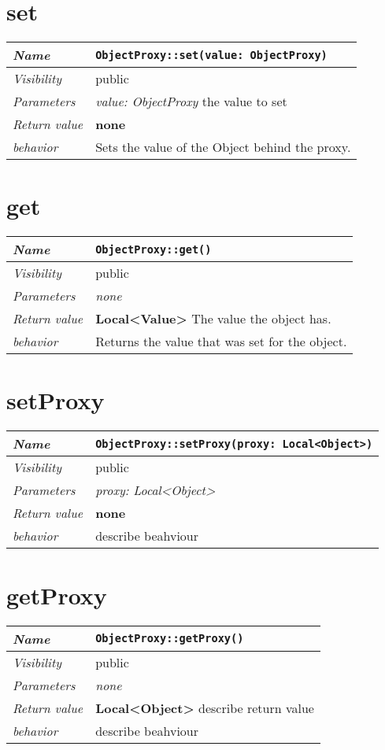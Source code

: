  \section{set}
\begin{longtable}{p{3cm} @{\hskip 1cm} p{12cm}}
 \hline
\textit{Name} & \texttt{ObjectProxy::set(value: ObjectProxy)}\\
\hline
 \textit{Visibility} & public\\
\hline
\textit{Parameters} & \textit{value: ObjectProxy} the value to set\\
\hline
\textit{Return value} & \textbf{none}\\
  \hline
 \textit{behavior} & Sets the value of the Object behind the proxy.\\
\hline
\end{longtable} \pagebreak
 \section{get}
\begin{longtable}{p{3cm} @{\hskip 1cm} p{12cm}}
 \hline
\textit{Name} & \texttt{ObjectProxy::get()}\\
\hline
 \textit{Visibility} & public\\
\hline
\textit{Parameters} & \textit{none}\\
\hline
\textit{Return value} & \textbf{Local<Value>} The value the object has.\\
  \hline
 \textit{behavior} & Returns the value that was set for the object.\\
\hline
\end{longtable} \pagebreak
 \section{setProxy}
\begin{longtable}{p{3cm} @{\hskip 1cm} p{12cm}}
 \hline
\textit{Name} & \texttt{ObjectProxy::setProxy(proxy: Local<Object>)}\\
\hline
 \textit{Visibility} & public\\
\hline
\textit{Parameters} & \textit{proxy: Local<Object>}\\
\hline
\textit{Return value} & \textbf{none}\\
  \hline
 \textit{behavior} & describe beahviour \\
\hline
\end{longtable} \pagebreak
 \section{getProxy}
\begin{longtable}{p{3cm} @{\hskip 1cm} p{12cm}}
 \hline
\textit{Name} & \texttt{ObjectProxy::getProxy()}\\
\hline
 \textit{Visibility} & public\\
\hline
\textit{Parameters} & \textit{none}\\
\hline
\textit{Return value} & \textbf{Local<Object>} describe return value\\
  \hline
 \textit{behavior} & describe beahviour \\
\hline
\end{longtable} \pagebreak
